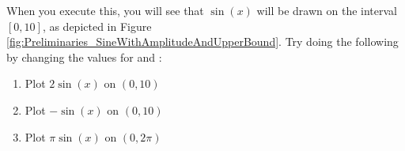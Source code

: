 
When you execute this, you will see that $\sin(x)$ will be drawn on the interval $[0,10]$, as depicted in Figure \ref{fig:Preliminaries_SineWithAmplitudeAndUpperBound}. Try doing the following by changing the values for  and :

\begin{enumerate}
	   \item Plot $2\sin(x)$ on $(0,10)$
	   \item Plot $-\sin(x)$ on $(0,10)$
	   \item Plot $\pi\sin(x)$ on $(0, 2 \pi)$
\end{enumerate}

